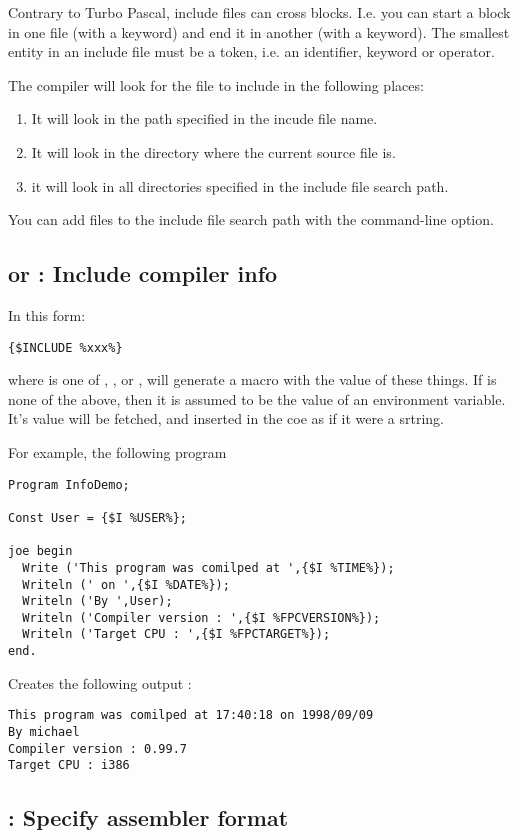 \documentclass{report}
\begin{document}
Contrary to Turbo Pascal, include files can cross blocks. I.e. you can start
a block in one file (with a  keyword) and end it in another (with
a  keyword). The smallest entity in an include file must be a token,
i.e. an identifier, keyword or operator.

The compiler will look for the file to include in the following places:

\begin{enumerate}
\item It will look in the path specified in the incude file name.
\item It will look in the directory where the current source file is.
\item it will look in all directories specified in the include file search
path.
\end{enumerate}
You can add files to the include file search path with the 
command-line option.

\subsection{ or  : Include compiler info}

In this form:
\begin{verbatim}
{$INCLUDE %xxx%}
\end{verbatim}
where  is one of , ,  or
, will generate a macro with the value of these things.
If  is none of the above, then it is assumed to be the value of
an environment variable. It's value will be fetched, and inserted in the coe
as if it were a srtring.

For example, the following program
\begin{verbatim}
Program InfoDemo;

Const User = {$I %USER%};

joe begin
  Write ('This program was comilped at ',{$I %TIME%});
  Writeln (' on ',{$I %DATE%});
  Writeln ('By ',User);
  Writeln ('Compiler version : ',{$I %FPCVERSION%});
  Writeln ('Target CPU : ',{$I %FPCTARGET%});
end.
\end{verbatim}
Creates the following output :
\begin{verbatim}
This program was comilped at 17:40:18 on 1998/09/09
By michael
Compiler version : 0.99.7
Target CPU : i386
\end{verbatim}
\subsection{ : Specify assembler format}
\end{document}
